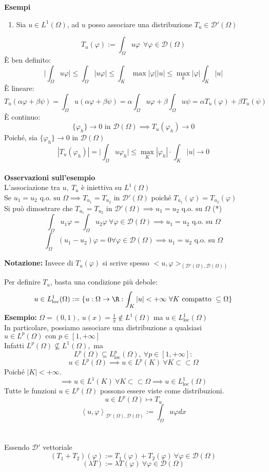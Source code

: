 \textbf{Esempi} 
\begin{enumerate}
	\item Sia $u\in L^{1}(\Omega)$, ad $u$ posso associare una distribuzione $T_u\in \mathcal D'(\Omega)$
\end{enumerate}
\[T_u(\varphi):=\int_{\Omega}^{} u\varphi\ \ \forall \varphi\in \mathcal D(\Omega)\]
È ben definito:
\[\bigg| \int_{\Omega}^{} u\varphi\bigg|\le \int_{\Omega}^{} |u\varphi|\le \int_{K}^{} \max |\varphi | |u|\le \max_k|\varphi|\int_{K}^{} |u|  \]  
È lineare:
\[T_u(\alpha\varphi+\beta\psi)=\int_{\Omega}^{} u(\alpha\varphi+\beta\psi)=\alpha \int_{\Omega}^{} u\varphi +\beta \int_{\Omega}^{}u\psi =\alpha T_u(\varphi)+\beta T_u(\psi)   \]
È continuo:
\[\{\varphi_h\} \to 0\text{ in }\mathcal D(\Omega)\implies T_u(\varphi_h)\to 0\]
Poiché, sia $\{\varphi_h\} \to 0\text{ in }\mathcal D(\Omega)$
\[|T_u(\varphi_h)|=\bigg|\int_{\Omega}^{} u\varphi_h \bigg|\le \max_K|\varphi_h|\cdot \int_{K}^{} |u|\to 0\]  
\\\textbf{Osservazioni sull'esempio} 
\\L'associazione tra $u,\ T_u$ è iniettiva su $L^{1}(\Omega)$
\\Se $u_1=u_2\text{ q.o. su }\Omega\implies T_{u_1}=T_{u_2}\text{ in }\mathcal D'(\Omega)$ poiché $T_{u_1}(\varphi)=T_{u_2}(\varphi)$
\\Si può dimostrare che $T_{u_1}=T_{u_2}\text{ in }\mathcal D'(\Omega)\implies u_1=u_2 \text{ q.o. su }\Omega$ (*)
\[\int_{\Omega}^{} u_1\varphi = \int_{\Omega}^{} u_2\varphi\ \forall \varphi\in \mathcal D(\Omega)\implies u_1=u_2\text{ q.o. su } \Omega\] 
\[\int_{\Omega}^{} (u_1-u_2)\varphi =0 \forall \varphi\in \mathcal D(\Omega)\implies u_1=u_2\text{ q.o. su } \Omega\] 
\divider
\begin{tcolorbox}
\textbf{Notazione:} Invece di $T_u(\varphi)$ si scrive spesso $<u,\varphi>_{(\mathcal D'(\Omega), \mathcal D(\Omega))}$
\end{tcolorbox}
Per definire $T_u$, basta una condizione più debole:
\[u\in L^1_{\text{loc}}(\Omega):=\{u:\Omega\to \R: \int_{K}^{} |u|<+\infty\ \forall K\text{ compatto }\subseteq  \Omega \}\]
\textbf{Esempio:} $\Omega=(0,1),\ u(x)=\frac{1}{x}\not\in L^1(\Omega)$ ma $u\in L^1_{\text{loc}}(\Omega)$
\\In particolare, possiamo associare una distribuzione a qualsiasi $u\in L^{p}(\Omega)\text{ con } p \in [1,+\infty]$ 
\\Infatti $L^{p}(\Omega)\not \subseteq  L^1(\Omega), $ ma 
\[L^{p}(\Omega)\subseteq  L^p_{\text{loc}}(\Omega),\ \forall  p \in [1,+\infty]:\]
\[u\in L^{p}(\Omega)\implies u\in L^{p}(K)\ \forall K \subset \subset \Omega\]
Poiché $|K|<+\infty$.
\[\implies u \in L^{1}(K)\ \forall K \subset  \subset \Omega \implies u\in L_{\text{loc}}^1(\Omega)\]
Tutte le funzioni $u\in L^{p}(\Omega)$ possono essere viste come distribuzioni.
\[u\in L^{p}(\Omega)\mapsto T_u\]
\[\left<u,\varphi \right>_{\mathcal D'(\Omega), \mathcal D(\Omega)}:=\int_{\Omega}^{} u\varphi dx\]
\divider\\
\\Essendo $\mathcal D'$ vettoriale
\[(T_1+T_2)(\varphi):=T_1(\varphi)+T_2(\varphi)\ \forall \varphi\in \mathcal D(\Omega)\]
\[(\lambda T):=\lambda T(\varphi) \ \forall \varphi \in \mathcal D(\Omega)\]
